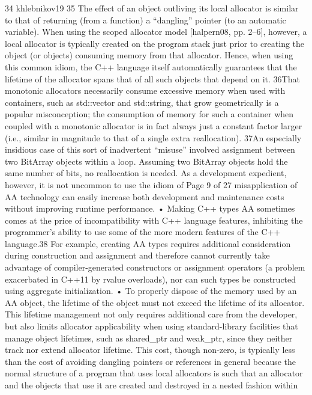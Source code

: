 34 khlebnikov19
35 The effect of an object outliving its local allocator is similar to that of returning (from a function) a
“dangling” pointer (to an automatic variable). When using the scoped allocator model [halpern08, pp.
2–6], however, a local allocator is typically created on the program stack just prior to creating the
object (or objects) consuming memory from that allocator. Hence, when using this common idiom, the
C++ language itself automatically guarantees that the lifetime of the allocator spans that of all such
objects that depend on it.
36That monotonic allocators necessarily consume excessive memory when used with containers, such
as std::vector and std::string, that grow geometrically is a popular misconception; the
consumption of memory for such a container when coupled with a monotonic allocator is in fact
always just a constant factor larger (i.e., similar in magnitude to that of a single extra reallocation).
37An especially insidious case of this sort of inadvertent “misuse” involved assignment between two
BitArray objects within a loop. Assuming two BitArray objects hold the same number of bits, no
reallocation is needed. As a development expedient, however, it is not uncommon to use the idiom of 
Page 9 of 27
misapplication of AA technology can easily increase both development and
maintenance costs without improving runtime performance.
• Making C++ types AA sometimes comes at the price of incompatibility with C++
language features, inhibiting the programmer’s ability to use some of the more
modern features of the C++ language.38 For example, creating AA types
requires additional consideration during construction and assignment and
therefore cannot currently take advantage of compiler-generated constructors
or assignment operators (a problem exacerbated in C++11 by rvalue
overloads), nor can such types be constructed using aggregate initialization.
• To properly dispose of the memory used by an AA object, the lifetime of the
object must not exceed the lifetime of its allocator. This lifetime management
not only requires additional care from the developer, but also limits allocator
applicability when using standard-library facilities that manage object
lifetimes, such as shared_ptr and weak_ptr, since they neither track nor
extend allocator lifetime. This cost, though non-zero, is typically less than the
cost of avoiding dangling pointers or references in general because the normal
structure of a program that uses local allocators is such that an allocator and
the objects that use it are created and destroyed in a nested fashion within
